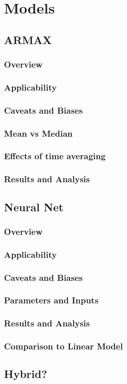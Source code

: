 \chapter[Models]{Models}

\section{ARMAX}

\subsection{Overview}

\subsection{Applicability}

\subsection{Caveats and Biases}

\subsection{Mean vs Median}

\subsection{Effects of time averaging}

\subsection{Results and Analysis}



\section{Neural Net}

\subsection{Overview}

\subsection{Applicability}

\subsection{Caveats and Biases}

\subsection{Parameters and Inputs}

\subsection{Results and Analysis}

\subsection{Comparison to Linear Model}

\section{Hybrid?}